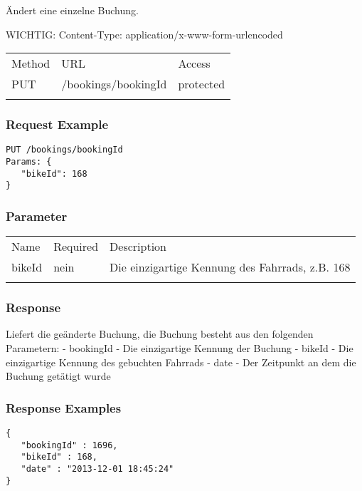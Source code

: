 Ändert eine einzelne Buchung.

WICHTIG: Content-Type: application/x-www-form-urlencoded

\begin{longtable}[c]{@{}lll@{}}
\toprule\addlinespace
Method & URL & Access
\\\addlinespace
\midrule\endhead
PUT & /bookings/bookingId & protected
\\\addlinespace
\bottomrule
\end{longtable}

\subsubsection{Request Example}\label{request-example}

\begin{verbatim}
PUT /bookings/bookingId
Params: {
   "bikeId": 168
}
\end{verbatim}

\subsubsection{Parameter}\label{parameter}

\begin{longtable}[c]{@{}lll@{}}
\toprule\addlinespace
Name & Required & Description
\\\addlinespace
\midrule\endhead
bikeId & nein & Die einzigartige Kennung des Fahrrads, z.B. 168
\\\addlinespace
\bottomrule
\end{longtable}

\subsubsection{Response}\label{response}

Liefert die geänderte Buchung, die Buchung besteht aus den folgenden
Parametern: - bookingId - Die einzigartige Kennung der Buchung - bikeId
- Die einzigartige Kennung des gebuchten Fahrrads - date - Der Zeitpunkt
an dem die Buchung getätigt wurde

\subsubsection{Response Examples}\label{response-examples}

\begin{verbatim}
{
   "bookingId" : 1696,
   "bikeId" : 168,
   "date" : "2013-12-01 18:45:24"
}
\end{verbatim}
